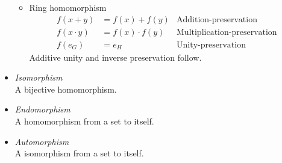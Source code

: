\documentclass[11pt,a4paper]{article}
\begin{document}
\begin{itemize}
\begin{itemize}
            \item Ring homomorphism
                \begin{align*}
                    f(x + y) &= f(x) + f(y) & \text{Addition-preservation} \\
                    f(x \cdot y) &= f(x) \cdot f(y) & \text{Multiplication-preservation} \\
                    f(e_G) &= e_H & \text{Unity-preservation}
                \end{align*}
                Additive unity and inverse preservation follow.
        \end{itemize}

    \item \emph{Isomorphism} \\
        A bijective homomorphism.
    \item \emph{Endomorphism} \\
        A homomorphism from a set to itself.
    \item \emph{Automorphism} \\
        A isomorphism from a set to itself.

\end{itemize}
\end{document}
